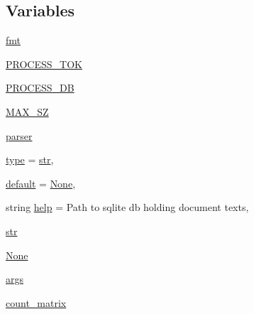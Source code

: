 \subsection*{Variables}
\begin{DoxyCompactItemize}
\item 
\hyperlink{namespaceparlai_1_1agents_1_1tfidf__retriever_1_1build__tfidf_a685888e410b4ff0977b0b750edda9db5}{fmt}
\item 
\hyperlink{namespaceparlai_1_1agents_1_1tfidf__retriever_1_1build__tfidf_ae5c3818e71ddea3c79328d8a4c423047}{P\+R\+O\+C\+E\+S\+S\+\_\+\+T\+OK}
\item 
\hyperlink{namespaceparlai_1_1agents_1_1tfidf__retriever_1_1build__tfidf_a27ac3f448b895f9daae56e01bbf1be70}{P\+R\+O\+C\+E\+S\+S\+\_\+\+DB}
\item 
\hyperlink{namespaceparlai_1_1agents_1_1tfidf__retriever_1_1build__tfidf_ae004cad36f1e393ce6c158058a526eeb}{M\+A\+X\+\_\+\+SZ}
\item 
\hyperlink{namespaceparlai_1_1agents_1_1tfidf__retriever_1_1build__tfidf_a21ca3f18c69cd5e11f4f9ec6505e0a24}{parser}
\item 
\hyperlink{namespaceparlai_1_1agents_1_1tfidf__retriever_1_1build__tfidf_ad5dfae268e23f506da084a9efb72f619}{type} = \hyperlink{namespaceparlai_1_1agents_1_1tfidf__retriever_1_1build__tfidf_a213e3a3970a4f1423c2cc41e5f31295e}{str},
\item 
\hyperlink{namespaceparlai_1_1agents_1_1tfidf__retriever_1_1build__tfidf_a57d9eff8ee0e54e71c094de21fc72684}{default} = \hyperlink{namespaceparlai_1_1agents_1_1tfidf__retriever_1_1build__tfidf_ad50f77b70c0e27d3304395c58e9212c4}{None},
\item 
string \hyperlink{namespaceparlai_1_1agents_1_1tfidf__retriever_1_1build__tfidf_a078522f7d10d021f5e4855b140fc9666}{help} = \textquotesingle{}Path to sqlite db holding document texts\textquotesingle{},
\item 
\hyperlink{namespaceparlai_1_1agents_1_1tfidf__retriever_1_1build__tfidf_a213e3a3970a4f1423c2cc41e5f31295e}{str}
\item 
\hyperlink{namespaceparlai_1_1agents_1_1tfidf__retriever_1_1build__tfidf_ad50f77b70c0e27d3304395c58e9212c4}{None}
\item 
\hyperlink{namespaceparlai_1_1agents_1_1tfidf__retriever_1_1build__tfidf_aa48318cbcc3882ee8fe371c672cbf941}{args}
\item 
\hyperlink{namespaceparlai_1_1agents_1_1tfidf__retriever_1_1build__tfidf_afe20f2925824bab82a89672734347544}{count\+\_\+matrix}
\item 

\end{DoxyCompactItemize}
